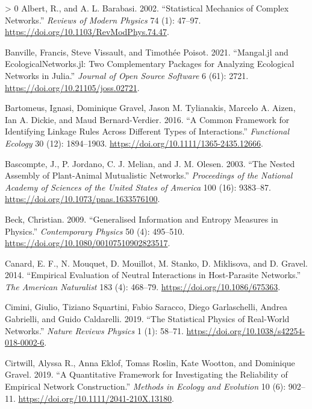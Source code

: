 \documentclass[11pt]{article}
\newlength{\cslhangindent}
\newenvironment{CSLReferences}[3] %
 {%
  \setlength{\parindent}{0pt}
  \ifodd #1 \everypar{\setlength{\hangindent}{\cslhangindent}}\ignorespaces\fi
  \ifnum #2 > 0
  \setlength{\parskip}{#2\baselineskip}
  \fi
 }%
 {}
\begin{document}
\hypertarget{refs}{}
\begin{CSLReferences}{1}{0}
\leavevmode\hypertarget{ref-Albert2002StaMec}{}%
Albert, R., and A. L. Barabasi. 2002. {``Statistical Mechanics of
Complex Networks.''} \emph{Reviews of Modern Physics} 74 (1): 47--97.
\url{https://doi.org/10.1103/RevModPhys.74.47}.

\leavevmode\hypertarget{ref-Banville2021ManJla}{}%
Banville, Francis, Steve Vissault, and Timothée Poisot. 2021.
{``Mangal.jl and EcologicalNetworks.jl: Two Complementary Packages for
Analyzing Ecological Networks in Julia.''} \emph{Journal of Open Source
Software} 6 (61): 2721. \url{https://doi.org/10.21105/joss.02721}.

\leavevmode\hypertarget{ref-Bartomeus2016ComFra}{}%
Bartomeus, Ignasi, Dominique Gravel, Jason M. Tylianakis, Marcelo A.
Aizen, Ian A. Dickie, and Maud Bernard-Verdier. 2016. {``A Common
Framework for Identifying Linkage Rules Across Different Types of
Interactions.''} \emph{Functional Ecology} 30 (12): 1894--1903.
\url{https://doi.org/10.1111/1365-2435.12666}.

\leavevmode\hypertarget{ref-Bascompte2003NesAssa}{}%
Bascompte, J., P. Jordano, C. J. Melian, and J. M. Olesen. 2003. {``The
Nested Assembly of Plant-Animal Mutualistic Networks.''}
\emph{Proceedings of the National Academy of Sciences of the United
States of America} 100 (16): 9383--87.
\url{https://doi.org/10.1073/pnas.1633576100}.

\leavevmode\hypertarget{ref-Beck2009GenInf}{}%
Beck, Christian. 2009. {``Generalised Information and Entropy Measures
in Physics.''} \emph{Contemporary Physics} 50 (4): 495--510.
\url{https://doi.org/10.1080/00107510902823517}.

\leavevmode\hypertarget{ref-Canard2014EmpEva}{}%
Canard, E. F., N. Mouquet, D. Mouillot, M. Stanko, D. Miklisova, and D.
Gravel. 2014. {``Empirical Evaluation of Neutral Interactions in
Host-Parasite Networks.''} \emph{The American Naturalist} 183 (4):
468--79. \url{https://doi.org/10.1086/675363}.

\leavevmode\hypertarget{ref-Cimini2019StaPhy}{}%
Cimini, Giulio, Tiziano Squartini, Fabio Saracco, Diego Garlaschelli,
Andrea Gabrielli, and Guido Caldarelli. 2019. {``The Statistical Physics
of Real-World Networks.''} \emph{Nature Reviews Physics} 1 (1): 58--71.
\url{https://doi.org/10.1038/s42254-018-0002-6}.

\leavevmode\hypertarget{ref-Cirtwill2019QuaFrac}{}%
Cirtwill, Alyssa R., Anna Eklof, Tomas Roslin, Kate Wootton, and
Dominique Gravel. 2019. {``A Quantitative Framework for Investigating
the Reliability of Empirical Network Construction.''} \emph{Methods in
Ecology and Evolution} 10 (6): 902--11.
\url{https://doi.org/10.1111/2041-210X.13180}.


\end{CSLReferences}
\end{document}
